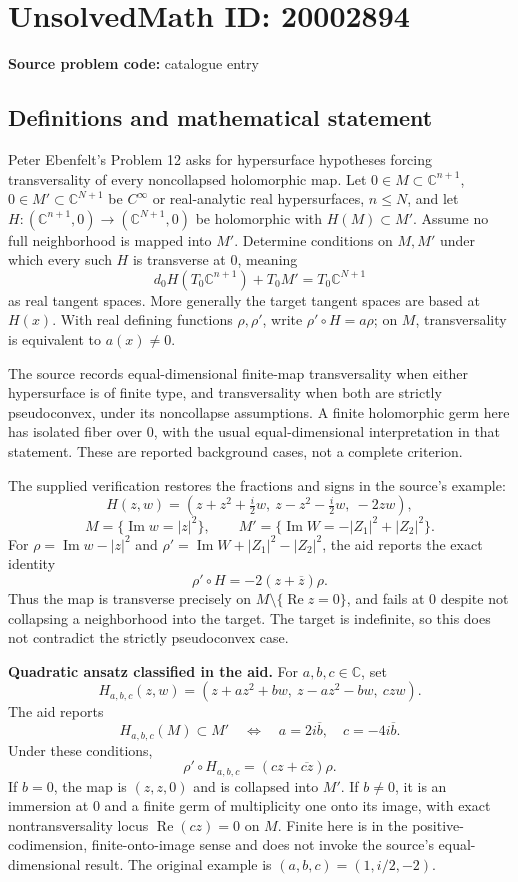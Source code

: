 \documentclass[11pt]{article}
\newcommand{\C}{\mathbb{C}}
\begin{document}
\section*{UnsolvedMath ID: 20002894}
\textbf{Source problem code:} catalogue entry
\subsection{Definitions and mathematical statement}
Peter Ebenfelt's Problem 12 asks for hypersurface hypotheses forcing transversality of every noncollapsed holomorphic map. Let \(0\in M\subset\C^{n+1}\), \(0\in M'\subset\C^{N+1}\) be \(C^\infty\) or real-analytic real hypersurfaces, \(n\le N\), and let \(H:(\C^{n+1},0)\to(\C^{N+1},0)\) be holomorphic with \(H(M)\subset M'\). Assume no full neighborhood is mapped into \(M'\). Determine conditions on \(M,M'\) under which every such \(H\) is transverse at 0, meaning
\[
 d_0H(T_0\C^{n+1})+T_0M'=T_0\C^{N+1}
\]
as real tangent spaces. More generally the target tangent spaces are based at \(H(x)\). With real defining functions \(\rho,\rho'\), write \(\rho'\circ H=a\rho\); on \(M\), transversality is equivalent to \(a(x)\ne0\).

The source records equal-dimensional finite-map transversality when either hypersurface is of finite type, and transversality when both are strictly pseudoconvex, under its noncollapse assumptions. A finite holomorphic germ here has isolated fiber over 0, with the usual equal-dimensional interpretation in that statement. These are reported background cases, not a complete criterion.

The supplied verification restores the fractions and signs in the source's example:
\[
 H(z,w)=(z+z^2+\tfrac i2w,\ z-z^2-\tfrac i2w,\ -2zw),
\]
\[
 M=\{\operatorname{Im}w=|z|^2\},\qquad
 M'=\{\operatorname{Im}W=-|Z_1|^2+|Z_2|^2\}.
\]
For \(\rho=\operatorname{Im}w-|z|^2\) and \(\rho'=\operatorname{Im}W+|Z_1|^2-|Z_2|^2\), the aid reports the exact identity
\[
 \rho'\circ H=-2(z+\overline z)\rho.
\]
Thus the map is transverse precisely on \(M\setminus\{\operatorname{Re}z=0\}\), and fails at 0 despite not collapsing a neighborhood into the target. The target is indefinite, so this does not contradict the strictly pseudoconvex case.

\textbf{Quadratic ansatz classified in the aid.} For \(a,b,c\in\C\), set
\[
 H_{a,b,c}(z,w)=(z+az^2+bw,\ z-az^2-bw,\ czw).
\]
The aid reports
\[
 H_{a,b,c}(M)\subset M'
 \quad\Longleftrightarrow\quad
 a=2i\overline b,\quad c=-4i\overline b.
\]
Under these conditions,
\[
 \rho'\circ H_{a,b,c}=(cz+\overline{cz})\rho.
\]
If \(b=0\), the map is \((z,z,0)\) and is collapsed into \(M'\). If \(b\ne0\), it is an immersion at 0 and a finite germ of multiplicity one onto its image, with exact nontransversality locus \(\operatorname{Re}(cz)=0\) on \(M\). Finite here is in the positive-codimension, finite-onto-image sense and does not invoke the source's equal-dimensional result. The original example is \((a,b,c)=(1,i/2,-2)\).
\end{document}

